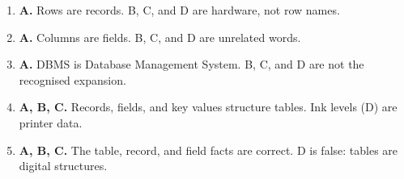 \documentclass[11pt]{article}
\begin{document}
\begin{enumerate}[label=\textbf{Q\arabic*.}, leftmargin=*]
\item \textbf{A.} Rows are records. B, C, and D are hardware, not row names.
\item \textbf{A.} Columns are fields. B, C, and D are unrelated words.
\item \textbf{A.} DBMS is Database Management System. B, C, and D are not the recognised expansion.
\item \textbf{A, B, C.} Records, fields, and key values structure tables. Ink levels (D) are printer data.
\item \textbf{A, B, C.} The table, record, and field facts are correct. D is false: tables are digital structures.
\end{enumerate}
\def\JKSSBLessonID{28}\def\JKSSBAnswers{1}
\end{document}
